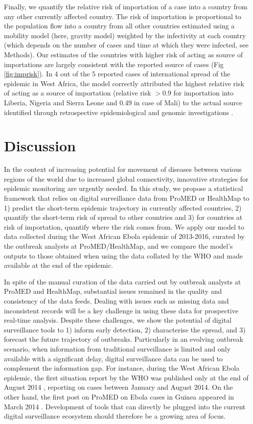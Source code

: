 \documentclass[9pt,twocolumn,twoside,lineno]{pnas-new}
\begin{document}
Finally, we quantify the relative risk of importation of a case into a
country from any other currently affected country. The risk of
importation is proportional to the population flow into a country from
all other countries estimated using a mobility model (here, gravity
model) weighted by the infectivity at each country (which
depends on the number of cases and time at which they were infected,
see Methods). Our
estimates of the countries with higher risk of acting as source of
importations are largely consistent with the reported source of cases
(Fig \ref{fig:imprisk}). In 4 out of the 5 reported cases of international spread
of the epidemic in West Africa, the model correctly attributed
the highest relative
risk of acting as a source of importation (relative risk $ >
  0.9$ for importation into 
Liberia, Nigeria and Sierra Leone and 0.49 in case of Mali) to the actual source
identified through retrospective epidemiological and genomic
investigations \cite{gire2014genomic}.


\section*{Discussion}\label{discussion}

In the context of increasing potential for movement of diseases between
various regions of the world due to increased global connectivity,
innovative strategies for epidemic monitoring are urgently needed. In
this study, we propose a statistical framework that relies on digital
surveillance data from ProMED or HealthMap to 1) predict the short-term
epidemic trajectory in currently affected countries, 2) quantify the
short-term risk of spread to other countries and 3) for countries at
risk of importation, quantify where the risk comes from. We apply our model to data
collected during the West African Ebola epidemic of 2013-2016, curated
by the outbreak analysts at ProMED/HealthMap, and we compare the model's outputs
to those obtained when using the data collated by the WHO and made
available at the end of the epidemic.

In spite of the manual curation of the data carried out by
outbreak analysts at ProMED and HealthMap, substantial issues remained in
the quality and consistency of the data feeds. Dealing with issues such
as missing data and inconsistent records will be a key challenge in
using these data for prospective real-time analysis. Despite these
challenges, we show the potential of digital surveillance tools to
1) inform early detection, 2) characterise the spread, and 3) forecast
the future trajectory of outbreaks. Particularly in an evolving outbreak
scenario, when information from traditional surveillance is limited and
only available with a significant delay, digital surveillance data can
be used to complement the information gap. For instance, during the West
African Ebola epidemic, the first situation report by the WHO was
published only at the end of August 2014 \cite{whositrep}, 
reporting on cases between January and August 2014. On the other
hand, the first post on ProMED on Ebola cases in Guinea appeared in
March 2014 \cite{pmfirstebola}. Development of tools that can directly be
plugged into the current digital surveillance ecosystem should therefore
be a growing area of focus.
\end{document}
